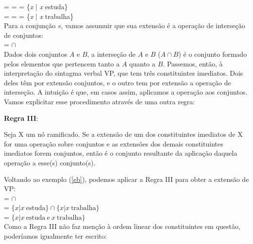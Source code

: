 \n {} =  =  = \{\textit{x} | \textit{x} estuda\}\\


\n {} =  =  = \{\textit{x} | \textit{x} trabalha\}\\

\n Para a conjun\-ção \textit{e}, vamos assumuir que sua extensão é a operação de interseção de conjuntos:\\

\n {} = $\cap$\\

\n Dados dois conjuntos $A$ e $B$, a interse\-ção de $A$ e
$B$ ($A \cap B$) é o conjunto formado pelos elementos que
pertencem tanto a $A$ quanto a $B$. Passemos, então, à interpreta\-ção do sintagma verbal VP, que tem
três constituintes imediatos. Dois deles têm por extensão
conjuntos, e o outro tem por extensão a opera\-ção de
interse\-ção. A intuição é que, em casos assim, aplicamos a operação aos conjuntos. Vamos explicitar esse procedimento através de uma outra regra:\\

\begin{tcolorbox}[boxrule=0pt,sharp corners]

\n \textbf{Regra III}:

\n Seja X um nó ramificado. Se a extensão de um dos constituintes
imediatos de X for uma opera\-ção sobre conjuntos e as extensões
dos demais constituintes imediatos forem conjuntos, então 
é o conjunto resultante da
aplica\-ção daquela opera\-ção a esse(s) conjunto(s).

\end{tcolorbox}

\bigskip

Voltando ao exemplo (\ref{eb}), podemos aplicar a Regra III
para obter a extensão de VP:\\

\n {} =  $\cap$ \\

\n {} = $\{x | x\ \text{estuda}\} \cap
\{x | x\ \text{trabalha}\}$\\

\n {} = $\{x | x\ \text{estuda}\ \text{e}\ x\ \text{trabalha}\}$\\

\n Como a Regra III não faz menção à ordem linear dos
constituintes em questão, poderíamos igualmente ter escrito:\\

